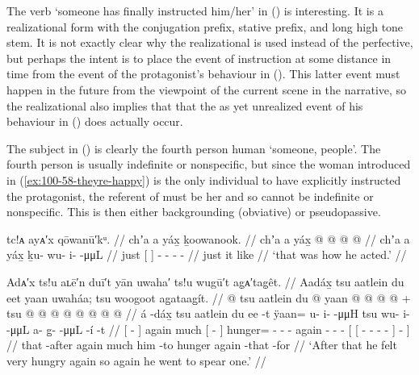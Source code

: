 The verb  ‘someone has finally instructed him/her’ in (\lastx) is interesting.
It is a realizational form with the  conjugation prefix,  stative prefix, and long high tone  stem.
It is not exactly clear why the realizational is used instead of the perfective, but perhaps the intent is to place the event of instruction at some distance in time from the event of the protagonist’s behaviour in (\nextx).
This latter event must happen in the future from the viewpoint of the current scene in the narrative, so the realizational also implies that that the as yet unrealized event of his behaviour in (\nextx) does actually occur.

The subject in (\lastx) is clearly the fourth person human  ‘someone, people’.
The fourth person is usually indefinite or nonspecific, but since the woman introduced in (\ref{ex:100-58-theyre-happy}) is the only individual to have explicitly instructed the protagonist, the referent of  must be her and so cannot be indefinite or nonspecific.
This  is then either backgrounding (obviative) or pseudopassive.

\ex\label{ex:100-69-so-he-did}%
%
\begingl
	\glpreamble	tc!ᴀ ayᴀ′x qōwanū′kᵘ. //
	\glpreamble	chʼa a yáx̱ ḵoowanook. //
	\gla	chʼa {} a yáx̱ {}
		 @ {} @ {} @ {} @ {} //
	\glb	chʼa {} a yáx̱ {}
		ḵu- wu- i-  -μμL //
	\glc	just {}[   {}]
		- - -  - //
	\gld	just {} it like {}
		 {} {} {} {} //
	\glft	‘that was how he acted.’
		//
\endgl
\xe

\ex\label{ex:100-70-got-hungry-went-to-spear}%
%
\begingl
	\glpreamble	 Adᴀ′x ts!u aʟē′n duī′t yān uwaha′ ts!u wugū′t ag̣ᴀ′tag̣êt. //
	\glpreamble	Aadáx̱ tsu aatlein du eet yaan uwaháa; tsu woogoot ag̱ataag̱ít. //
	\gla	{}  @ {} {} 
		tsu aatlein
		{} du  @ {} {}
		yaan @  @ {} @ {} @ {} +
		tsu  @ {} @ {} @ {}
		{} {}  @ {} @ {} @ {} @ {} @ {} {} {} {} //
	\glb	{} á -dáx̱ {}
		tsu aatlein
		{} du ee -t {} 
		ÿaan= u- i-  -μμH
		tsu wu- i-  -μμL
		{} {} a- {} g̱-  -μμL -í {} -t {} //
	\glc	{}[  - {}]
		again much 
		{}[   - {}]
		hunger= -  -  -
		again - -  -
		{}[ {}[ - \· -  - - {}] - {}] //
	\gld	{} that -after {}
		again much
		{} him {} -to {} 
		hunger  {} {} {}
		again  {} {} {}
		{} {}  {} {} {} {} -that {} -for {} //
	\glft	‘After that he felt very hungry again so again he went to spear one.’
		//
\endgl
\xe

